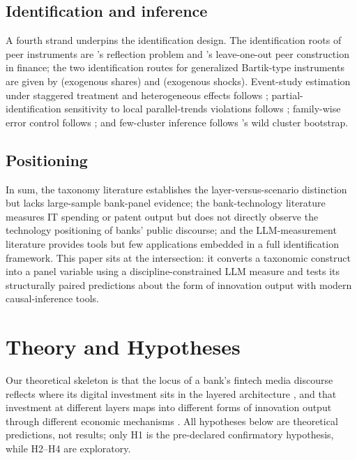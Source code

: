 \subsection{Identification and inference}

A fourth strand underpins the identification design. The identification roots of peer
instruments are \textcite{manski1993reflection}'s reflection problem and
\textcite{leary2014peereffects}'s leave-one-out peer construction in finance; the two
identification routes for generalized Bartik-type instruments are given by
\textcite{goldsmithpinkham2020bartik} (exogenous shares) and
\textcite{borusyak2022shiftshare} (exogenous shocks). Event-study estimation under
staggered treatment and heterogeneous effects follows
\parencite{sunabraham2021eventstudy,callaway2021difference,borusyak2024revisiting};
partial-identification sensitivity to local parallel-trends violations follows
\textcite{rambachan2023honestdid}; family-wise error control follows
\textcite{romanowolf2005stepdown}; and few-cluster inference follows
\textcite{roodman2019boottest}'s wild cluster bootstrap.

\subsection{Positioning}

In sum, the taxonomy literature establishes the layer-versus-scenario distinction but
lacks large-sample bank-panel evidence; the bank-technology literature measures IT
spending or patent output but does not directly observe the technology positioning of
banks' public discourse; and the LLM-measurement literature provides tools but few
applications embedded in a full identification framework. This paper sits at the
intersection: it converts a taxonomic construct into a panel variable using a
discipline-constrained LLM measure and tests its structurally paired predictions about
the form of innovation output with modern causal-inference tools.

\section{Theory and Hypotheses}\label{sec:hypo}

Our theoretical skeleton is that the locus of a bank's fintech media discourse reflects
where its digital investment sits in the layered architecture
\parencite{gomber2017cube,yoo2010layered}, and that investment at different layers maps
into different forms of innovation output through different economic mechanisms
\parencite{boot2021fintech,adner2010ecosystem}. All hypotheses below are theoretical
predictions, not results; only H1 is the pre-declared confirmatory hypothesis, while
H2--H4 are exploratory.

